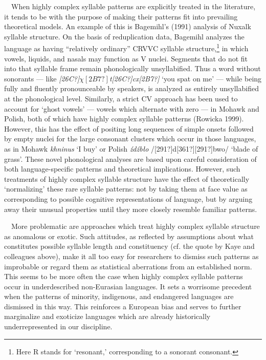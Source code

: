 \documentclass[12pt]{article}
\newenvironment{styleBody}{\renewcommand\baselinestretch{1.0}\setlength\leftskip{0in}\setlength\rightskip{0in plus 1fil}\setlength\parindent{0in}\setlength\parfillskip{0pt plus 1fil}\setlength\parskip{0in plus 1pt}\writerlistparindent\writerlistleftskip\leavevmode\normalfont\normalsize\fontsize{11pt}{13.2pt}\selectfont\mdseries\upshape\writerlistlabel\ignorespaces}{\unskip\vspace{0in plus 1pt}\par}
\newcommand\writerlistleftskip{}
\newcommand\writerlistparindent{}
\newcommand\writerlistlabel{}
\begin{document}
\begin{styleBody}
\ \ When highly complex syllable patterns are explicitly treated in the literature, it tends to be with the purpose of making their patterns fit into prevailing theoretical models. An example of this is Bagemihl’s (1991) analysis of Nuxalk syllable structure. On the basis of reduplication data, Bagemihl analyzes the language as having “relatively ordinary” CRVVC syllable structure,\footnote{Here R stands for ‘resonant,’ corresponding to a sonorant consonant.} in which vowels, liquids, and nasals may function as V nuclei. Segments that do not fit into that syllable frame remain phonologically unsyllabified. Thus a word without sonorants — like \textit{[26C?]$\chi [2B7?]$t[26C?]cx[2B7?]} ‘you spat on me’ — while being fully and fluently pronounceable by speakers, is analyzed as entirely unsyllabified at the phonological level. Similarly, a strict CV approach has been used to account for ‘ghost vowels’ — vowels which alternate with zero — in Mohawk and Polish, both of which have highly complex syllable patterns (Rowicka 1999). However, this has the effect of positing long sequences of simple onsets followed by empty nuclei for the large consonant clusters which occur in those languages, as in Mohawk \textit{khninus} ‘I buy’ or Polish \textit{źdźbło }/[291?]d[361?][291?]bwo/ ‘blade of grass’. These novel phonological analyses are based upon careful consideration of both language-specific patterns and theoretical implications. However, such treatments of highly complex syllable structure have the effect of theoretically ‘normalizing’ these rare syllable patterns: not by taking them at face value as corresponding to possible cognitive representations of language, but by arguing away their unusual properties until they more closely resemble familiar patterns.
\end{styleBody}

\begin{styleBody}
\ \ More problematic are approaches which treat highly complex syllable structure as anomalous or exotic. Such attitudes, as reflected by assumptions about what constitutes possible syllable length and constituency (cf. the quote by Kaye and colleagues above), make it all too easy for researchers to dismiss such patterns as improbable or regard them as statistical aberrations from an established norm. This seems to be more often the case when highly complex syllable patterns occur in underdescribed non-Eurasian languages. It sets a worrisome precedent when the patterns of minority, indigenous, and endangered languages are dismissed in this way. This reinforces a European bias and serves to further marginalize and exoticize languages which are already historically underrepresented in our discipline.
\end{styleBody}
\end{document}
